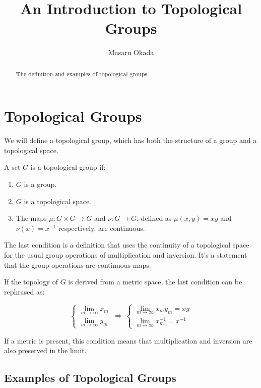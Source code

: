 \documentclass[uplatex,a4j,12pt,dvipdfmx]{jsarticle}
\title{
An Introduction to Topological Groups
}
\author{
Masaru Okada
}
\begin{document}
\maketitle


\begin{abstract}
	The definition and examples of topological groups
\end{abstract}

\section{Topological Groups}

We will define a topological group, which has both the structure of a group and a topological space.

A set $G$ is a topological group if:

\begin{enumerate}
	\item $G$ is a group.
	\item $G$ is a topological space.
	\item The maps $\mu: G \times G \to G$ and $\nu: G \to G$, defined as $\mu(x,y)=xy$ and $\nu(x) = x^{-1}$ respectively, are continuous.
\end{enumerate}

The last condition is a definition that uses the continuity of a topological space for the usual group operations of multiplication and inversion.
It's a statement that the group operations are continuous maps.


If the topology of $G$ is derived from a metric space, the last condition can be rephrased as:

\[
	\left\{
	\begin{array}{r}
		\displaystyle \lim_{ m \to \infty } x_{m} \\
		\displaystyle \lim_{ m \to \infty } y_{m}
	\end{array}
	\right.
	\ \Rightarrow \
	\left\{
	\begin{array}{r}
		\displaystyle \lim_{m \to \infty } x_{m} y_{m} = xy \\
		\displaystyle \lim_{m \to \infty } x_{m}^{-1} = x^{-1}
	\end{array}
	\right.
\]

If a metric is present, this condition means that multiplication and inversion are also preserved in the limit.





\subsection{Examples of Topological Groups}
\end{document}
